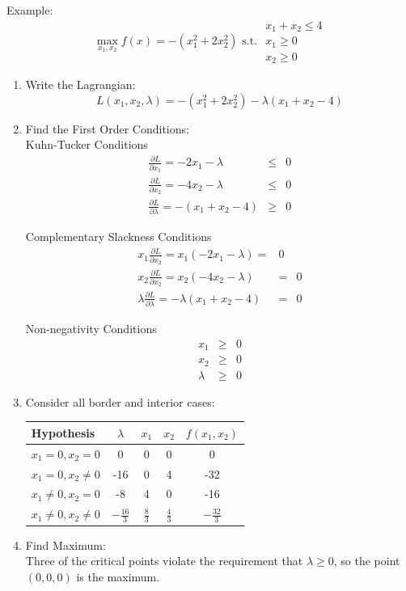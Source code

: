 \documentclass[]{book}
\theoremstyle{definition}
\theoremstyle{definition}
\theoremstyle{definition}
\theoremstyle{remark}
\begin{document}
Example: \[\max_{x_1,x_2} f(x) = -(x_1^2 + 2x_2^2) \text{ s.t. } 
\begin{array}{l}
x_1 + x_2 \le 4\\
x_1 \ge 0\\
x_2 \ge 0
\end{array}\]

\begin{enumerate}
\item Write the Lagrangian:
$$L(x_1, x_2, \lambda) =  -(x_1^2 + 2x_2^2) - \lambda(x_1 + x_2 - 4)$$

\item Find the First Order Conditions:\\
Kuhn-Tucker Conditions
 \begin{eqnarray*}
\frac{\partial L}{\partial x_1} = -2x_1 - \lambda  & \leq & 0\\
\frac{\partial L}{\partial x_2}  = -4x_2 - \lambda & \leq  & 0\\
\frac{\partial L}{\partial \lambda} = -(x_1 + x_2 - 4)& \geq & 0
\end{eqnarray*}

Complementary Slackness Conditions
\begin{eqnarray*}
x_1\frac{\partial L}{\partial x_2} = x_1(-2x_1 - \lambda)  = & 0\\
x_2\frac{\partial L}{\partial x_2} = x_2(-4x_2 - \lambda)  & = & 0\\
\lambda\frac{\partial L}{\partial \lambda} = -\lambda(x_1 + x_2 - 4)& = & 0
\end{eqnarray*}

Non-negativity Conditions
\begin{eqnarray*}
x_1 & \geq & 0\\
x_2 & \geq & 0\\
\lambda & \geq & 0
\end{eqnarray*}

\item Consider all border and interior cases:
\begin{center}
\begin{tabular}{|l|ccc|c|}
\hline
Hypothesis  & $\lambda$& $x_1$ & $x_2$ & $f(x_1, x_2)$\\
\hline
$x_1 = 0, x_2 = 0$  &0 & 0 & 0 & 0\\
$x_1 = 0, x_2 \neq 0$  &-16 & 0 & 4 & -32\\
$x_1 \neq 0, x_2 = 0$  &-8 & 4 & 0 & -16\\
$x_1 \neq 0, x_2 \neq 0$ & $-\frac{16}{3}$ & $\frac{8}{3}$ & $\frac{4}{3}$ & $-\frac{32}{3}$\\
\hline
\end{tabular}
\end{center}

\item  Find Maximum:\\
Three of the critical points violate the requirement that $\lambda \geq 0$, so the point $(0,0,0)$ is the maximum.\\
\end{enumerate}
\end{document}
